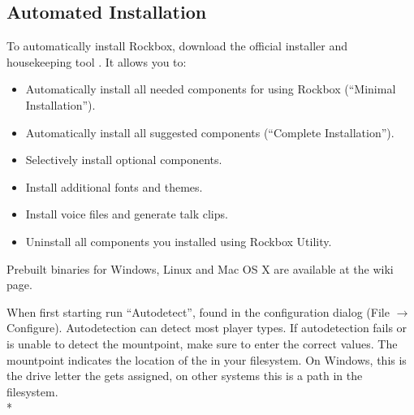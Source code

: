 \subsection{Automated Installation}

To automatically install Rockbox, download the official installer and
housekeeping tool . It allows you to:
\begin{itemize}
\item Automatically install all needed components for using Rockbox
        (``Minimal Installation'').
\item Automatically install all suggested components (``Complete Installation'').
\item Selectively install optional components.
\item Install additional fonts and themes.
\item Install voice files and generate talk clips.
\item Uninstall all components you installed using Rockbox Utility.
\end{itemize}

Prebuilt binaries for Windows, Linux and Mac OS X are
available at the  wiki page.\\


When first starting  run ``Autodetect'',
found in the configuration dialog (File $\rightarrow$ Configure). Autodetection
can detect most player types. If autodetection fails or is unable to detect
the mountpoint, make sure to enter the correct values. The mountpoint indicates
the location of the \dap{} in your filesystem. On Windows, this is the drive
letter the \dap{} gets assigned, on other systems this is a path in the
filesystem.\\*


